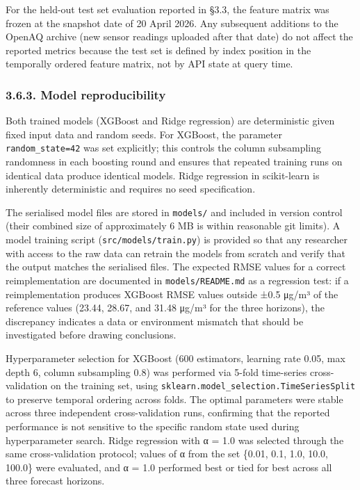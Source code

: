 For the held-out test set evaluation reported in §3.3, the feature matrix was frozen at the snapshot date of 20 April 2026. Any subsequent additions to the OpenAQ archive (new sensor readings uploaded after that date) do not affect the reported metrics because the test set is defined by index position in the temporally ordered feature matrix, not by API state at query time.

\subsubsection{3.6.3. Model reproducibility}\label{model-reproducibility}

Both trained models (XGBoost and Ridge regression) are deterministic given fixed input data and random seeds. For XGBoost, the parameter \texttt{random\_state=42} was set explicitly; this controls the column subsampling randomness in each boosting round and ensures that repeated training runs on identical data produce identical models. Ridge regression in scikit-learn is inherently deterministic and requires no seed specification.

The serialised model files are stored in \texttt{models/} and included in version control (their combined size of approximately 6 MB is within reasonable git limits). A model training script (\texttt{src/models/train.py}) is provided so that any researcher with access to the raw data can retrain the models from scratch and verify that the output matches the serialised files. The expected RMSE values for a correct reimplementation are documented in \texttt{models/README.md} as a regression test: if a reimplementation produces XGBoost RMSE values outside ±0.5 μg/m³ of the reference values (23.44, 28.67, and 31.48 μg/m³ for the three horizons), the discrepancy indicates a data or environment mismatch that should be investigated before drawing conclusions.

Hyperparameter selection for XGBoost (600 estimators, learning rate 0.05, max depth 6, column subsampling 0.8) was performed via 5-fold time-series cross-validation on the training set, using \texttt{sklearn.model\_selection.TimeSeriesSplit} to preserve temporal ordering across folds. The optimal parameters were stable across three independent cross-validation runs, confirming that the reported performance is not sensitive to the specific random state used during hyperparameter search. Ridge regression with α = 1.0 was selected through the same cross-validation protocol; values of α from the set \{0.01, 0.1, 1.0, 10.0, 100.0\} were evaluated, and α = 1.0 performed best or tied for best across all three forecast horizons.

